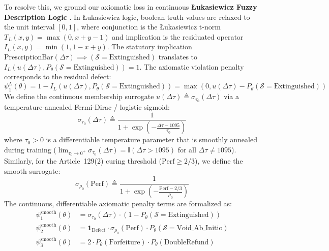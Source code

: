 \documentclass[11pt,a4paper]{article}
\begin{document}
To resolve this, we ground our axiomatic loss in continuous \textbf{\L{}ukasiewicz Fuzzy Description Logic} \citep{lukasiewicz1970selected, hajek2013metamathematics, van2022analyzing}. In \L{}ukasiewicz logic, boolean truth values are relaxed to the unit interval $[0, 1]$, where conjunction is the \L{}ukasiewicz t-norm $T_L(x, y) = \max(0, x + y - 1)$ and implication is the residuated operator $I_L(x, y) = \min(1, 1 - x + y)$. The statutory implication $\text{PrescriptionBar}(\Delta \tau) \implies (\mathcal{S} = \text{Extinguished})$ translates to $I_L(u(\Delta \tau), P_\theta(\mathcal{S} = \text{Extinguished})) = 1$. The axiomatic violation penalty corresponds to the residual defect:
\begin{equation}
\psi_1^L(\theta) = 1 - I_L(u(\Delta \tau), P_\theta(\mathcal{S} = \text{Extinguished})) = \max\left(0, u(\Delta \tau) - P_\theta(\mathcal{S} = \text{Extinguished})\right)
\end{equation}
We define the continuous membership surrogate $u(\Delta \tau) \triangleq \sigma_{\tau_0}(\Delta \tau)$ via a temperature-annealed Fermi-Dirac / logistic sigmoid:
\begin{equation}
\label{eq:sigma_tau0}
\sigma_{\tau_0}(\Delta \tau) \triangleq \frac{1}{1 + \exp\left(-\frac{\Delta \tau - 1095}{\tau_0}\right)}
\end{equation}
where $\tau_0 > 0$ is a differentiable temperature parameter that is smoothly annealed during training ($\lim_{\tau_0 \to 0^+} \sigma_{\tau_0}(\Delta \tau) = \mathbb{I}(\Delta \tau > 1095)$ for all $\Delta \tau \neq 1095$). Similarly, for the Article~129(2) curing threshold ($\mathrm{Perf} \ge 2/3$), we define the smooth surrogate:
\begin{equation}
\label{eq:sigma_rho0}
\sigma_{\rho_0}(\mathrm{Perf}) \triangleq \frac{1}{1 + \exp\left(-\frac{\mathrm{Perf} - 2/3}{\rho_0}\right)}
\end{equation}
The continuous, differentiable axiomatic penalty terms are formalized as:
\begin{align}
\psi_1^{\text{smooth}}(\theta) &= \sigma_{\tau_0}(\Delta \tau) \cdot (1 - P_\theta(\mathcal{S} = \text{Extinguished})) \label{eq:pen1} \\
\psi_2^{\text{smooth}}(\theta) &= \mathbf{1}_{\text{Defect}} \cdot \sigma_{\rho_0}(\mathrm{Perf}) \cdot P_\theta(\mathcal{S} = \text{Void\_Ab\_Initio}) \label{eq:pen2} \\
\psi_3^{\text{smooth}}(\theta) &= 2 \cdot P_\theta(\text{Forfeiture}) \cdot P_\theta(\text{DoubleRefund}) \label{eq:pen3}
\end{align}
\end{document}
